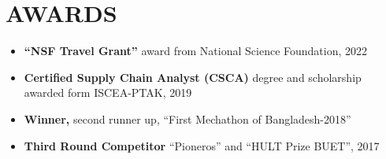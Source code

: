 \documentclass[letterpaper,11pt]{article}
\newcommand{\resumeItem}[1]{
  \item\small{
    {#1 \vspace{-2pt}}
  }
}
\newcommand{\resumeItemListStart}{\begin{itemize}}
\newcommand{\resumeItemListEnd}{\end{itemize}\vspace{-5pt}}
\begin{document}
\section{AWARDS}

            \resumeItemListStart
                \resumeItem{\textbf{“NSF Travel Grant” } award from National Science Foundation, 2022}
                \vspace{-4pt}
                \resumeItem{\textbf{Certified Supply Chain Analyst (CSCA)} degree and scholarship awarded form ISCEA-PTAK, 2019}
                \vspace{-4pt}
                \resumeItem{\textbf{Winner,} second runner up, “First Mechathon of Bangladesh-2018”}
                \vspace{-4pt}
                \resumeItem{\textbf{Third Round Competitor} “Pioneros” and “HULT Prize BUET”, 2017}
            \resumeItemListEnd
\end{document}
